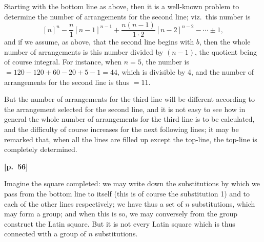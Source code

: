 \documentclass[11pt,a4paper]{article}
\theoremstyle{plain}
\begin{document}
Starting with the bottom line as above, then it is a well-known problem to determine the number of arrangements for the second line; viz.\ this number is
$$
[n]^n - \frac{n}{1}[n-1]^{n-1} + \frac{n(n-1)}{1 \cdot 2}[n-2]^{n-2} - \cdots \pm 1,
$$
and if we assume, as above, that the second line begins with $b$, then the whole number of arrangements is this number divided by $(n - 1)$, the quotient being of course integral. For instance, when $n = 5$, the number is $= 120 - 120 + 60 - 20 + 5 - 1 = 44$, which is divisible by 4, and the number of arrangements for the second line is thus $= 11$.

But the number of arrangements for the third line will be different according to the arrangement selected for the second line, and it is not easy to see how in general the whole number of arrangements for the third line is to be calculated, and the difficulty of course increases for the next following lines; it may be remarked that, when all the lines are filled up except the top-line, the top-line is completely determined.

\vspace{0.5em}
\noindent\textbf{[p.\ 56]}

Imagine the square completed: we may write down the substitutions by which we pass from the bottom line to itself (this is of course the substitution 1) and to each of the other lines respectively; we have thus a set of $n$ substitutions, which may form a group; and when this is so, we may conversely from the group construct the Latin square. But it is not every Latin square which is thus connected with a group of $n$ substitutions.
\end{document}

